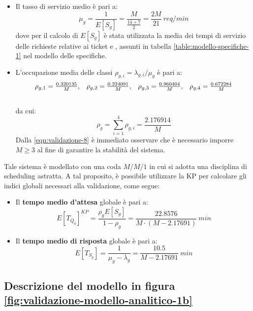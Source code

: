 \begin{itemize}
\item Il tasso di servizio medio è pari a:
\begin{equation}
\label{eqn:validazione-6}
\mu_g = \frac{1}{E[S_g]} = \frac{M}{\frac{14+7}{2}} = \frac{2M}{21}\ req/min
\end{equation}
dove per il calcolo di $E[S_g]$ è stata utilizzata la media dei tempi di servizio delle richieste relative ai ticket \uo{} e \pp{}, assunti in tabella \ref{table:modello-specifiche-1} nel modello delle specifiche.

\item L'occupazione media delle classi $\rho_{g,i} = \lambda_{g,i}/\mu_g$ è pari a:
\begin{equation}
\begin{array}{l l l l}
\rho_{g,1} = \frac{0.320135}{M}, & \rho_{g,2} = \frac{0.224091}{M}, & \rho_{g,3} = \frac{0.960404}{M}, & \rho_{g,4} = \frac{0.672284}{M} \\[1.5em]
\end{array}
\end{equation}
da cui:
\begin{equation}
\label{eqn:validazione-8}
\rho_g = \sum_{i=1}^4 \rho_{g,i} = \frac{2.176914}{M}
\end{equation}
Dalla \ref{eqn:validazione-8} è immediato osservare che è necessario imporre $M \geq 3$ al fine di garantire la stabilità del sistema.
\end{itemize}

Tale sistema è modellato con una coda $M/M/1$ in cui si adotta una disciplina di scheduling astratta. A tal proposito, è possibile utilizzare la KP per calcolare gli indici globali necessari alla validazione, come segue:
\begin{itemize}
\item Il \textbf{tempo medio d'attesa} globale è pari a:
\begin{equation}
\label{eqn:validazione-11}
E[T_{Q_g}]^{KP} = \frac{\rho_g E[S_g]}{1-\rho_g} = \frac{22.8576}{M\cdot (M-2.17691)}\ min
\end{equation}
\item Il \textbf{tempo medio di risposta} globale è pari a:
\begin{equation}
\label{eqn:validazione-13}
E[T_{S_g}] = \frac{1}{\mu_g - \lambda_g} = \frac{10.5}{M-2.17691}\ min
\end{equation}
\end{itemize}

\subsection{Descrizione del modello in figura \ref{fig:validazione-modello-analitico-1b}}

